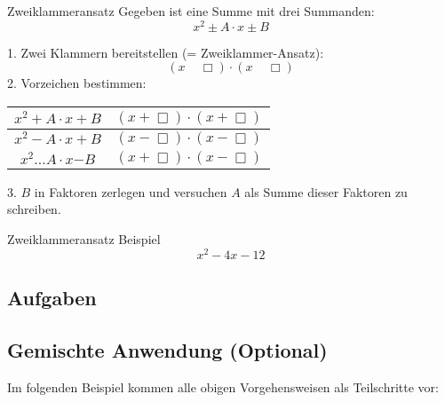 \begin{rezept}{Zweiklammeransatz}{}
Gegeben ist eine Summe mit drei Summanden:
$$x^2 \pm A\cdot{}x \pm B$$

1. Zwei Klammern bereitstellen (= Zweiklammer-Ansatz):
$$(x \,\,\,\,\,\,\, \Box)\cdot{}(x \,\,\,\,\,\,\, \Box)$$
2. Vorzeichen bestimmen:
\leserluft{}

  \begin{tabular}{|c@{$\Longrightarrow$}c|}\hline
   $x^2 + A\cdot{} x + B$ & $(x + \Box)\cdot{}(x + \Box)$\\\hline
   $x^2 - A\cdot{} x + B$ & $(x - \Box)\cdot{}(x - \Box)$\\\hline
   $x^2 ... A\cdot{} x \mathbf{-} B$ & $(x + \Box)\cdot{}(x - \Box)$\\\hline
   \end{tabular} 

\leserluft{}

3. $B$ in Faktoren zerlegen und versuchen $A$ als Summe dieser Faktoren zu schreiben.
\end{rezept}
\newpage
\begin{beispiel}{Zweiklammeransatz}{}
Beispiel
$$x^2 - 4x - 12$$
\end{beispiel}

\subsection*{Aufgaben}


\platzFuerBerechnungenBisEndeSeite{}
\newpage


\subsection{Gemischte Anwendung (Optional)}
Im folgenden Beispiel kommen alle obigen Vorgehensweisen als
Teilschritte vor:

\begin{center}{}\end{center}


